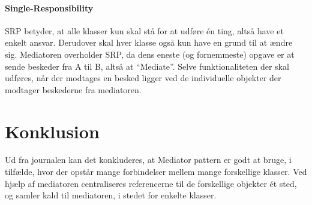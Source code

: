 \paragraph{Single-Responsibility}
SRP betyder, at alle klasser kun skal stå for at udføre én ting, altså have et enkelt ansvar. Derudover skal hver klasse også kun have en grund til at ændre sig. Mediatoren overholder SRP, da dens eneste (og fornemmeste) opgave er at sende beskeder fra A til B, altså at “Mediate”. Selve funktionaliteten der skal udføres, når der modtages en besked ligger ved de individuelle objekter der modtager beskederne fra mediatoren.

\section{Konklusion}
Ud fra journalen kan det konkluderes, at Mediator pattern er godt at bruge, i tilfælde, hvor der opstår mange forbindelser mellem mange forskellige klasser. Ved hjælp af mediatoren centraliseres referencerne til de forskellige objekter ét sted, og samler kald til mediatoren, i stedet for enkelte klasser.